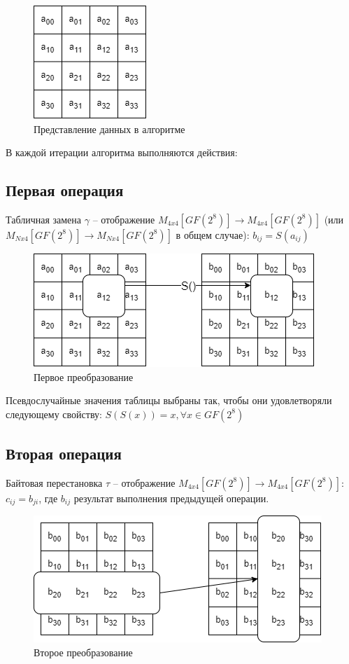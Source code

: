 \documentclass[12pt]{article}
\begin{document}
\begin{figure}[h]
    \centering
    \includegraphics[width=0.18\linewidth]{matrix.png}
    \caption{Представление данных в алгоритме}
    \label{fig:scheme}
\end{figure}
\newline
В каждой итерации алгоритма выполняются действия:

\subsection{Первая операция}
Табличная замена $\gamma$ -- отображение $M_{4x4}[GF(2^{8})] \to M_{4x4}[GF(2^{8})]$ (или $M_{Nx4}[GF(2^{8})] \to M_{Nx4}[GF(2^{8})]$ в общем случае): \newline
$b_{ij} = S(a_{ij})$

\begin{figure}[h]
    \centering
    \includegraphics[width=0.4\linewidth]{first_function.png}
    \caption{Первое преобразование}
    \label{fig:scheme}
\end{figure}
\newline
Псевдослучайные значения таблицы выбраны так, чтобы они удовлетворяли следующему свойству:
$S(S(x)) = x, \forall x \in GF(2^{8})$


\subsection{Вторая операция}
Байтовая перестановка $\tau$ -- отображение $M_{4x4}[GF(2^{8})] \to M_{4x4}[GF(2^{8})]$: \newline
$c_{ij} = b_{ji}$, где $b_{ij}$ результат выполнения предыдущей операции.

\begin{figure}[h]
    \centering
    \includegraphics[width=0.4\linewidth]{second_func.png}
    \caption{Второе преобразование}
    \label{fig:scheme}
\end{figure}
\end{document}
